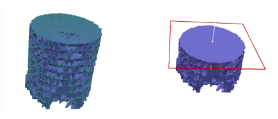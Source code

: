 \documentclass{beamer}
\begin{document}
\begin{frame}
		\begin{columns}
			\begin{column}{0.45\textwidth}
				\includegraphics[width=0.8\textwidth]{Ini2Cercles}
			\end{column}
			\begin{column}{0.45\textwidth}
				\includegraphics[width=0.8\textwidth]{coupeIni2Cercles}
			\end{column}
		\end{columns}
	\end{frame}
	
\end{document}
